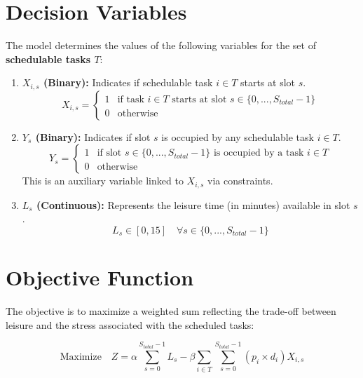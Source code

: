 \documentclass{article}
\begin{document}
\section{Decision Variables}

The model determines the values of the following variables for the set of \textbf{schedulable tasks $T$}:

\begin{enumerate}
    \item \textbf{$X_{i,s}$ (Binary):} Indicates if schedulable task $i \in T$ starts at slot $s$.
    \[ X_{i,s} = \begin{cases} 1 & \text{if task } i \in T \text{ starts at slot } s \in \{0, ..., S_{total}-1\} \\ 0 & \text{otherwise} \end{cases} \]

    \item \textbf{$Y_{s}$ (Binary):} Indicates if slot $s$ is occupied by any schedulable task $i \in T$.
    \[ Y_{s} = \begin{cases} 1 & \text{if slot } s \in \{0, ..., S_{total}-1\} \text{ is occupied by a task } i \in T \\ 0 & \text{otherwise} \end{cases} \]
    This is an auxiliary variable linked to $X_{i,s}$ via constraints.

    \item \textbf{$L_{s}$ (Continuous):} Represents the leisure time (in minutes) available in slot $s$.
    \[ L_{s} \in [0, 15] \quad \forall s \in \{0, ..., S_{total}-1\} \]
\end{enumerate}

\section{Objective Function}

The objective is to maximize a weighted sum reflecting the trade-off between leisure and the stress associated with the scheduled tasks:

\[
\text{Maximize} \quad Z = \alpha \sum_{s=0}^{S_{total}-1} L_s - \beta \sum_{i \in T} \sum_{s=0}^{S_{total}-1} (p_i \times d_i) X_{i,s}
\]
\end{document}
